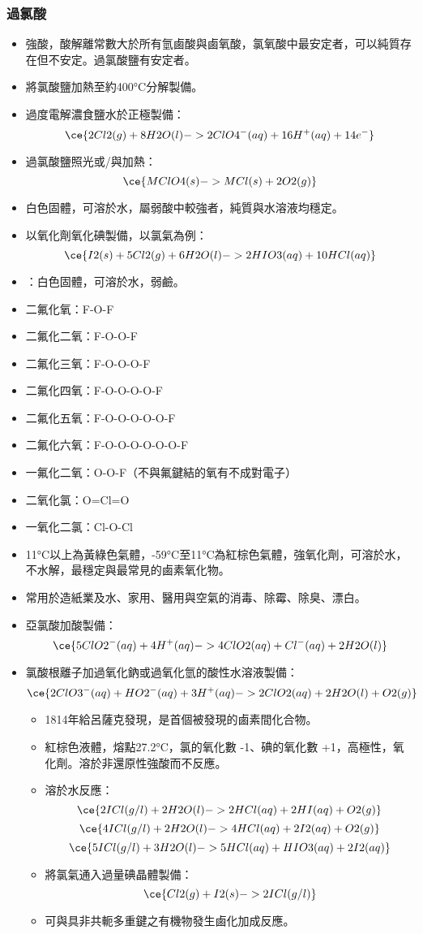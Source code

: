 \documentclass[a4paper,12pt]{report}
\begin{document}
\subsubsection{過氯酸}
\begin{itemize}
\item 強酸，酸解離常數大於所有氫鹵酸與鹵氧酸，氯氧酸中最安定者，可以純質存在但不安定。過氯酸鹽有安定者。
\item 將氯酸鹽加熱至約400°C分解製備。
\item 過度電解濃食鹽水於正極製備：
\[\ce{2Cl2(g) + 8H2O(l) -> 2ClO4^-(aq) + 16H^+(aq) + 14e^-}\]
\item 過氯酸鹽照光或/與加熱：
\[\ce{MClO4(s) -> MCl(s) + 2O2(g)}\]
\eit
{}
\bit
\item 白色固體，可溶於水，屬弱酸中較強者，純質與水溶液均穩定。
\item 以氧化劑氧化碘製備，以氯氣為例：
\[\ce{I2(s) + 5Cl2(g) + 6H2O(l) -> 2HIO3(aq) + 10HCl(aq)}\]
\item {}：白色固體，可溶於水，弱鹼。
\eit
{}
\bit
\item 二氟化氧：F-O-F
\item 二氟化二氧：F-O-O-F
\item 二氟化三氧：F-O-O-O-F
\item 二氟化四氧：F-O-O-O-O-F
\item 二氟化五氧：F-O-O-O-O-O-F
\item 二氟化六氧：F-O-O-O-O-O-O-F
\item 一氟化二氧：O-O-F（不與氟鍵結的氧有不成對電子）
\item 二氧化氯：O=Cl=O
\item 一氧化二氯：Cl-O-Cl
\eit
{}
\bit
\item 11°C以上為黃綠色氣體，-59°C至11°C為紅棕色氣體，強氧化劑，可溶於水，不水解，最穩定與最常見的鹵素氧化物。
\item 常用於造紙業及水、家用、醫用與空氣的消毒、除霉、除臭、漂白。
\item 亞氯酸加酸製備：
\[\ce{5ClO2^-(aq) + 4H^+(aq) -> 4ClO2(aq) + Cl^-(aq) + 2H2O(l)}\]
\item 氯酸根離子加過氧化鈉或過氧化氫的酸性水溶液製備：
\[\ce{2ClO3^-(aq) + HO2^-(aq) + 3H^+(aq) -> 2ClO2(aq) + 2H2O(l) + O2(g)}\]
\eit
{}
\begin{itemize}
\item 1814年給呂薩克發現，是首個被發現的鹵素間化合物。
\item 紅棕色液體，熔點27.2°C，氯的氧化數 -1、碘的氧化數 +1，高極性，氧化劑。溶於非還原性強酸而不反應。
\item 溶於水反應：
\[\ce{2ICl(g/l) + 2H2O(l) -> 2HCl(aq) + 2HI(aq) + O2(g)}\]
\[\ce{4ICl(g/l) + 2H2O(l) -> 4HCl(aq) + 2I2(aq) + O2(g)}\]
\[\ce{5ICl(g/l) + 3H2O(l) -> 5HCl(aq) + HIO3(aq) + 2I2(aq)}\]
\item 將氯氣通入過量碘晶體製備：
\[\ce{Cl2(g) + I2(s) -> 2ICl(g/l)}\]
\item 可與具非共軛多重鍵之有機物發生鹵化加成反應。
\end{itemize}

\end{itemize}
\end{document}
